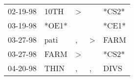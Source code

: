 \begin{supertabular}{lllll}
 02-19-98 &   10TH &  \textgreater &               &  *CS2* \\
 03-19-98 &  *OE1* &               &               &  *CE1* \\
 03-27-98 &   pati &             , &  \textgreater &   FARM \\
 03-27-98 &   FARM &  \textgreater &               &  *CS2* \\
 04-20-98 &   THIN &             , &             , &   DIVS \\
\end{supertabular}
